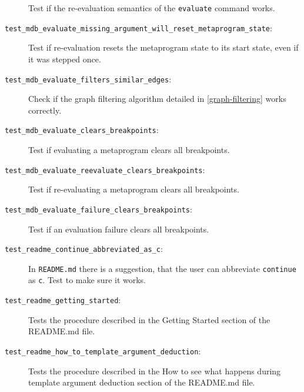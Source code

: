 \begin{description}
        Test if the re-evaluation semantics of the \texttt{evaluate} command
        works.
    \item[\texttt{test\_mdb\_evaluate\_missing\_argument\_will\_reset\_metaprogram\_state}:]
        Test if re-evaluation resets the metaprogram state to its start state,
        even if it was stepped once.
    \item[\texttt{test\_mdb\_evaluate\_filters\_similar\_edges}:]
        Check if the graph filtering algorithm detailed in
        \ref{graph-filtering} works correctly.
    \item[\texttt{test\_mdb\_evaluate\_clears\_breakpoints}:]
        Test if evaluating a metaprogram clears all breakpoints.
    \item[\texttt{test\_mdb\_evaluate\_reevaluate\_clears\_breakpoints}:]
        Test if re-evaluating a metaprogram clears all breakpoints.
    \item[\texttt{test\_mdb\_evaluate\_failure\_clears\_breakpoints}:]
        Test if an evaluation failure clears all breakpoints.
    \item[\texttt{test\_readme\_continue\_abbreviated\_as\_c}:]
        In \texttt{README.md} there is a suggestion, that the user can
        abbreviate \texttt{continue} as \texttt{c}. Test to make sure it works.
    \item[\texttt{test\_readme\_getting\_started}:]
        Tests the procedure described in the Getting Started section of the
        README.md file.
    \item[\texttt{test\_readme\_how\_to\_template\_argument\_deduction}:]
        Tests the procedure described in the How to see what happens during
        template argument deduction section of the README.md file.
\end{description}

